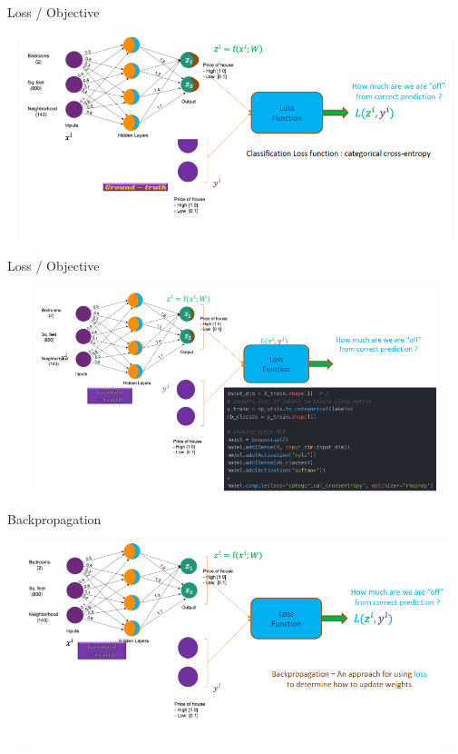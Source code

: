 \documentclass[aspectratio=169,14pt,usenames,dvipsnames]{beamer}
\begin{document}
\begin{frame}{Loss / Objective}

\includegraphics[width=14.5cm, height=6cm]{Keras_Images/Ker_18.png}

\end{frame}

\begin{frame}{Loss / Objective}

\includegraphics[width=14.5cm, height=6cm]{Keras_Images/Ker_19.png}

\end{frame}


\begin{frame}{Backpropagation}

\includegraphics[width=14.5cm, height=6cm]{Keras_Images/Ker_20.png}

\end{frame}
\end{document}

